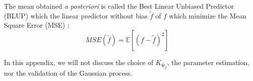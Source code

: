 \documentclass[soumission]{jsfds}
\edef\hc{\string: }
\begin{document}
\begin{appendices}
The mean obtained \textit{a posteriori} is called the Best Linear Unbiased Predictor (BLUP) which the linear predictor without bias $\tilde{f}$ of $f$ which minimize the Mean Square Error (MSE) \hc
\begin{equation}
MSE(\tilde{f})=\mathbb{E}[(f-\tilde{f})^2]
\end{equation}

In this appendix, we will not discuss the choice of $K_{\boldsymbol{\psi}_f}$, the parameter estimation, nor the validation of the Gaussian process.
\newpage

\end{appendices}






\end{document}
